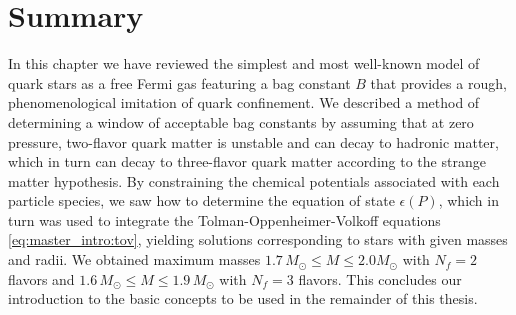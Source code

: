 \section{Summary}

In this chapter we have reviewed the simplest and most well-known model of quark stars
as a free Fermi gas featuring a bag constant $B$ that provides a rough, phenomenological imitation of quark confinement.
We described a method of determining a window of acceptable bag constants by assuming that at zero pressure,
two-flavor quark matter is unstable and can decay to hadronic matter,
which in turn can decay to three-flavor quark matter according to the strange matter hypothesis.
By constraining the chemical potentials associated with each particle species,
we saw how to determine the equation of state $\epsilon(P)$,
which in turn was used to integrate the Tolman-Oppenheimer-Volkoff equations \eqref{eq:master_intro:tov},
yielding solutions corresponding to stars with given masses and radii.
We obtained maximum masses $1.7 \, M_\odot \leq M \leq 2.0 M_\odot$ with $N_f=2$ flavors
and $1.6 \, M_\odot \leq M \leq 1.9 \, M_\odot$ with $N_f=3$ flavors.
This concludes our introduction to the basic concepts to be used in the remainder of this thesis.




